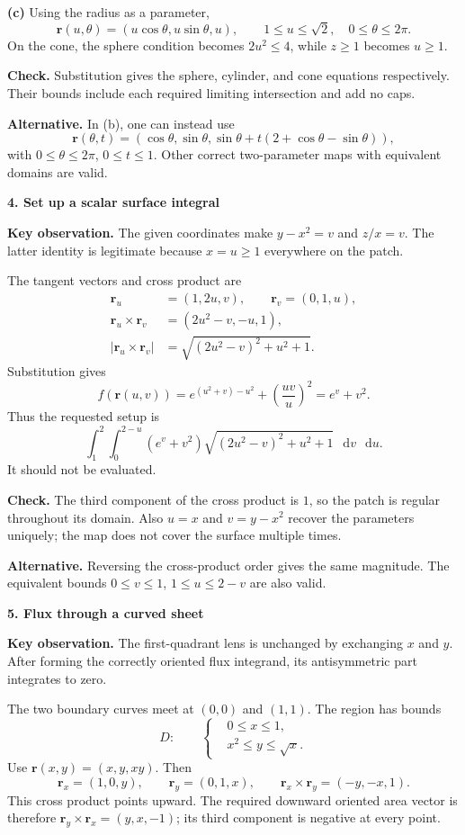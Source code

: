 \documentclass[11pt,letterpaper]{article}
\renewcommand{\vec}[1]{\mathbf{#1}}
\newcommand{\dd}{\mathop{}\!\mathrm{d}}
\newcommand{\solutionproblem}[3]{%
  \par\bigskip\Needspace{7\baselineskip}
  \noindent\textbf{#1. #2}\par\nobreak
}
\newcommand{\insight}[1]{\par\textbf{Key observation.} #1\par}
\newcommand{\verification}[1]{\par\textbf{Check.} #1\par}
\newcommand{\alternative}[1]{\par\textbf{Alternative.} #1\par}
\begin{document}
\textbf{(c)} Using the radius as a parameter,
\[
\boxed{\vec r(u,\theta)=(u\cos\theta,u\sin\theta,u)},\qquad
\boxed{1\le u\le\sqrt2,\quad0\le\theta\le2\pi}.
\]
On the cone, the sphere condition becomes $2u^2\le4$, while $z\ge1$
becomes $u\ge1$.
\verification{Substitution gives the sphere, cylinder, and cone equations
respectively. Their bounds include each required limiting intersection
and add no caps.}
\alternative{In (b), one can instead use
\[
\vec r(\theta,t)=(\cos\theta,\sin\theta,
\sin\theta+t(2+\cos\theta-\sin\theta)),
\]
with
$0\le\theta\le2\pi$, $0\le t\le1$. Other correct two-parameter maps
with equivalent domains are valid.}

\solutionproblem{4}{Set up a scalar surface integral}{12}
\insight{The given coordinates make $y-x^2=v$ and $z/x=v$. The latter
identity is legitimate because $x=u\ge1$ everywhere on the patch.}
The tangent vectors and cross product are
\[
\begin{aligned}
\vec r_u&=(1,2u,v),\qquad \vec r_v=(0,1,u),\\
\vec r_u\times\vec r_v&=(2u^2-v,-u,1),\\
\left|\vec r_u\times\vec r_v\right|
&=\sqrt{(2u^2-v)^2+u^2+1}.
\end{aligned}
\]
Substitution gives
\[
f(\vec r(u,v))=e^{(u^2+v)-u^2}
+\left(\frac{uv}{u}\right)^2=e^v+v^2.
\]
Thus the requested setup is
\[
\boxed{\displaystyle\int_1^2\int_0^{2-u}
(e^v+v^2)\sqrt{(2u^2-v)^2+u^2+1}\,\dd v\,\dd u}.
\]
It should not be evaluated.
\verification{The third component of the cross product is $1$, so the
patch is regular throughout its domain. Also $u=x$ and $v=y-x^2$
recover the parameters uniquely; the map does not cover the surface
multiple times.}
\alternative{Reversing the cross-product order gives the same magnitude.
The equivalent bounds $0\le v\le1$, $1\le u\le2-v$ are also valid.}

\solutionproblem{5}{Flux through a curved sheet}{20}
\insight{The first-quadrant lens is unchanged by exchanging $x$ and $y$.
After forming the correctly oriented flux integrand, its antisymmetric
part integrates to zero.}
The two boundary curves meet at $(0,0)$ and $(1,1)$. The region has bounds
\[
D:\qquad
\left\{
\begin{aligned}
&0\le x\le1,\\
&x^2\le y\le\sqrt x.
\end{aligned}
\right.
\]
Use $\vec r(x,y)=(x,y,xy)$. Then
\[
\vec r_x=(1,0,y),\qquad \vec r_y=(0,1,x),\qquad
\vec r_x\times\vec r_y=(-y,-x,1).
\]
This cross product points upward. The required downward oriented area
vector is therefore $\vec r_y\times\vec r_x=(y,x,-1)$; its third
component is negative at every point.
\end{document}
